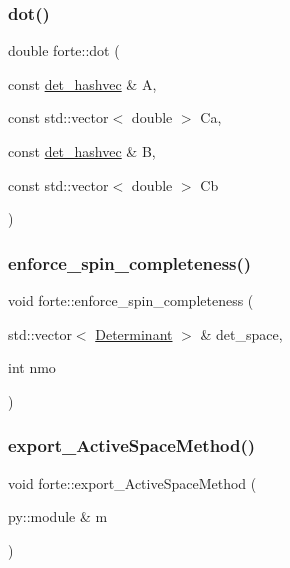 \mbox{\label{namespaceforte_a33ed0ede38050d6118cebec8d960cc6b}} 
\subsubsection{\texorpdfstring{dot()}{dot()}}
{\footnotesize\ttfamily double forte\+::dot (\begin{DoxyParamCaption}\item[{const \mbox{\hyperlink{namespaceforte_aee00ff2f656f0aa613d3f9f1ba01cad5}{det\+\_\+hashvec}} \&}]{A,  }\item[{const std\+::vector$<$ double $>$}]{Ca,  }\item[{const \mbox{\hyperlink{namespaceforte_aee00ff2f656f0aa613d3f9f1ba01cad5}{det\+\_\+hashvec}} \&}]{B,  }\item[{const std\+::vector$<$ double $>$}]{Cb }\end{DoxyParamCaption})}

\mbox{\label{namespaceforte_a46b5590d0414ccc26b7e6e83870d12bb}} 
\subsubsection{\texorpdfstring{enforce\+\_\+spin\+\_\+completeness()}{enforce\_spin\_completeness()}}
{\footnotesize\ttfamily void forte\+::enforce\+\_\+spin\+\_\+completeness (\begin{DoxyParamCaption}\item[{std\+::vector$<$ \mbox{\hyperlink{namespaceforte_a2076c63fd7b8732004d9e1442ce527c1}{Determinant}} $>$ \&}]{det\+\_\+space,  }\item[{int}]{nmo }\end{DoxyParamCaption})}

\mbox{\label{namespaceforte_aab6306844e1cd7c9cabd0d10f8c4403b}} 
\subsubsection{\texorpdfstring{export\+\_\+\+Active\+Space\+Method()}{export\_ActiveSpaceMethod()}}
{\footnotesize\ttfamily void forte\+::export\+\_\+\+Active\+Space\+Method (\begin{DoxyParamCaption}\item[{py\+::module \&}]{m }\end{DoxyParamCaption})}



